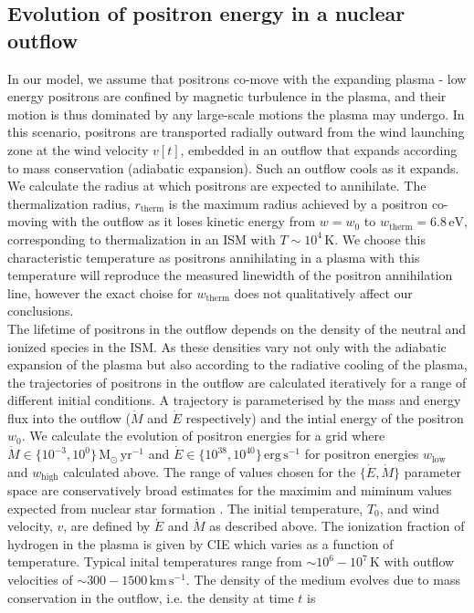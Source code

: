 \documentclass[a4paper,fleqn,usenatbib]{mnras}
\begin{document}
\subsection{Evolution of positron energy in a nuclear outflow}
In our model, we assume that positrons co-move with the expanding plasma - low energy positrons are confined by magnetic turbulence in the plasma, and their motion is thus dominated by any large-scale motions the plasma may undergo. In this scenario, positrons are transported radially outward from the wind launching zone at the wind velocity $v[t]$, embedded in an outflow that expands according to mass conservation (adiabatic expansion). Such an outflow cools as it expands.\\
We calculate the radius at which positrons are expected to annihilate. The thermalization radius, $r_\mathrm{therm}$ is the maximum radius achieved by a positron co-moving with the outflow as it loses kinetic energy from $w = w_0$ to $w_\mathrm{therm} = 6.8\,\mathrm{eV}$, corresponding to thermalization in an ISM with $T\sim10^4\,\mathrm{K}$. We choose this characteristic temperature as positrons annihilating in a plasma with this temperature will reproduce the measured linewidth of the positron annihilation line, however the exact choise for $w_\mathrm{therm}$ does not qualitatively affect our conclusions.\\
The lifetime of positrons in the outflow depends on the density of the neutral and ionized species in the ISM. As these densities vary not only with the adiabatic expansion of the plasma but also according to the radiative cooling of the plasma, the trajectories of positrons in the outflow are calculated iteratively for a range of different initial conditions. A trajectory is parameterised by the mass and energy flux into the outflow ($\dot{M}$ and $\dot{E}$ respectively) and the intial energy of the positron $w_0$. We calculate the evolution of positron energies for a grid where $\dot{M}\in\{10^{-3}, 10^0\}\,\mathrm{M_\odot\,yr^{-1}}$ and $\dot{E}\in\{10^{38}, 10^{40}\}\,\mathrm{erg\,s^{-1}}$ for positron energies $w_\mathrm{low}$ and $w_\mathrm{high}$ calculated above. The range of values chosen for the $\{\dot{E}, \dot{M}\}$ parameter space are conservatively broad estimates for the maximim and miminum values expected from nuclear star formation \citep{Crocker2012}. The initial temperature, $T_0$, and wind velocity, $v$, are defined by $\dot{E}$ and $\dot{M}$ as described above. The ionization fraction of hydrogen in the plasma is given by CIE \citep{MAPPINGS} which varies as a function of temperature. Typical inital temperatures range from $\sim 10^6 - 10^7\,\mathrm{K}$ with outflow velocities of $\sim 300 - 1500\,\mathrm{km\,s^{-1}}$. The density of the medium evolves due to mass conservation in the outflow, i.e. the density at time $t$ is
\end{document}
